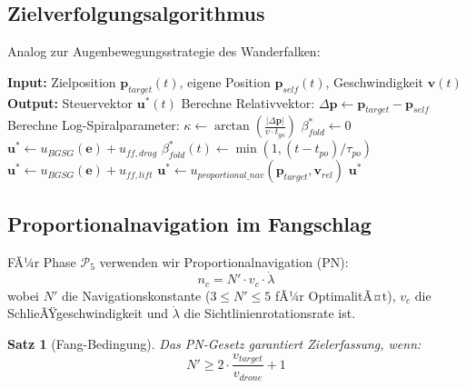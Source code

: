 ﻿\documentclass[12pt,a4paper]{article}
\newtheorem{theorem}{Satz}[section]
\theoremstyle{remark}
\begin{document}
	\subsection{Zielverfolgungsalgorithmus}
	
	Analog zur Augenbewegungsstrategie des Wanderfalken:
	
	\begin{algorithm}[H]
		\caption{BioFalcon-Tracking-Algorithmus}
		\label{alg:tracking}
		\begin{algorithmic}[1]
			\State \textbf{Input:} Zielposition $\mathbf{p}_{target}(t)$, eigene Position $\mathbf{p}_{self}(t)$, Geschwindigkeit $\mathbf{v}(t)$
			\State \textbf{Output:} Steuervektor $\mathbf{u}^*(t)$
			\State Berechne Relativvektor: $\Delta\mathbf{p} \gets \mathbf{p}_{target} - \mathbf{p}_{self}$
			\State Berechne Log-Spiralparameter: $\kappa \gets \arctan\left(\frac{|\Delta\mathbf{p}|}{v \cdot t_{go}}\right)$
			 
			\State $\beta^*_{fold} \gets 0$ 
			\State $\mathbf{u}^* \gets u_{BGSG}(\mathbf{e}) + u_{ff,drag}$
			 
			\State $\beta^*_{fold}(t) \gets \min(1, (t - t_{po})/\tau_{po})$ 
			\State $\mathbf{u}^* \gets u_{BGSG}(\mathbf{e}) + u_{ff,lift}$
			 
			\State $\mathbf{u}^* \gets u_{proportional\_nav}(\mathbf{p}_{target}, \mathbf{v}_{rel})$
			\EndIf
			\State \Return $\mathbf{u}^*$
		\end{algorithmic}
	\end{algorithm}
	
	\subsection{Proportionalnavigation im Fangschlag}
	
	FÃ¼r Phase $\mathcal{P}_5$ verwenden wir Proportionalnavigation (PN):
	\begin{equation}
		n_c = N' \cdot v_c \cdot \dot{\lambda}
	\end{equation}
	wobei $N'$ die Navigationskonstante ($3 \leq N' \leq 5$ fÃ¼r OptimalitÃ¤t), $v_c$ die SchlieÃŸgeschwindigkeit und $\dot{\lambda}$ die Sichtlinienrotationsrate ist.
	
	\begin{theorem}[Fang-Bedingung]
		Das PN-Gesetz garantiert Zielerfassung, wenn:
		\begin{equation}
			N' \geq 2 \cdot \frac{v_{target}}{v_{drone}} + 1
		\end{equation}
	\end{theorem}
	
\end{document}
